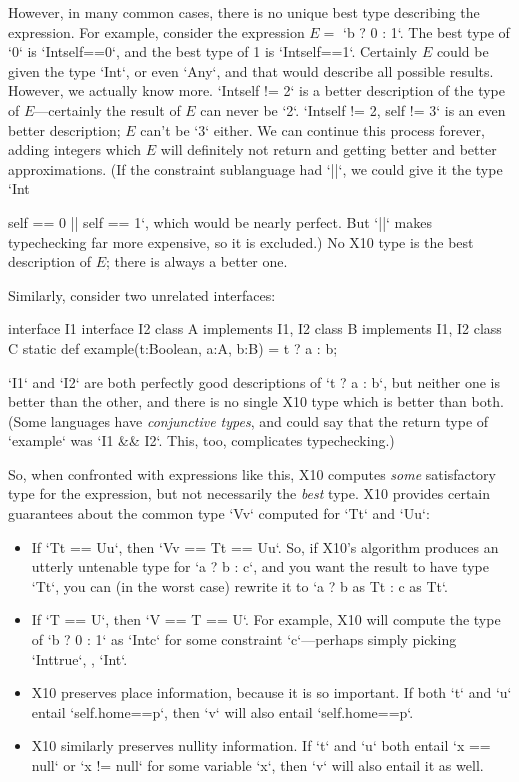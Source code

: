 However, in many common cases, there is no unique best type describing the
expression.  For example, consider the expression {$E=$} \xcd`b ? 0 : 1`.  The
best type of \xcd`0` 
is \xcd`Int{self==0}`, and the best type of 1 is \xcd`Int{self==1}`.
Certainly {$E$} could be given the type \xcd`Int`, or even \xcd`Any`, and that
would describe all possible results.  However, we actually know more.
\xcd`Int{self != 2}` is a better description of the type of {$E$}---certainly
the result of {$E$} can never be \xcd`2`.   \xcd`Int{self != 2, self != 3}` is
an even better description; {$E$} can't be \xcd`3` either.  We can continue
this process forever, adding integers which {$E$} will definitely not return
and getting better and better approximations. (If the constraint
sublanguage had \xcd`||`, we could give it the type 
\xcd`Int{self == 0 || self == 1`, which would be nearly perfect.  But 
\xcd`||` makes typechecking far more expensive, so it is excluded.)
No X10 type is the best description of {$E$}; there is always a better one.

Similarly, consider two unrelated interfaces: 
\begin{xten}
interface I1 {}
interface I2 {}
class A implements I1, I2 {}
class B implements I1, I2 {}
class C {
  static def example(t:Boolean, a:A, b:B) = t ? a : b;
}
\end{xten}
%
\xcd`I1` and \xcd`I2` are both perfectly good descriptions of \xcd`t ? a : b`, 
but neither one is better than the other, and there is no single X10 type
which is better than both. (Some languages have {\em conjunctive
    types}, and could say that the return type of \xcd`example` was 
\xcd`I1 && I2`.  This, too, complicates typechecking.)


So, when confronted with expressions like this, X10 computes {\em some}
satisfactory type for the expression, but not necessarily the {\em best} type.  
X10 provides certain guarantees about the common type \xcd`V{v}` computed for 
\xcd`T{t}` and \xcd`U{u}`: 
\begin{itemize}
\item If \xcd`T{t} == U{u}`, then \xcd`V{v} == T{t} == U{u}`.  So, if X10's
      algorithm produces an utterly untenable type for \xcd`a ? b : c`, and
      you want the result to have type \xcd`T{t}`, you can 
      (in the worst case) rewrite it to 
      \xcd`a ? b as T{t} : c as T{t}`.
\item If \xcd`T == U`, then \xcd`V == T == U`.  For example, 
      X10 will compute the type of \xcd`b ? 0 : 1` as 
      \xcd`Int{c}` for some constraint \xcd`c`---perhaps simply 
      picking \xcd`Int{true}`, \viz, \xcd`Int`. 
\item X10 preserves place information, because it is so important. If both
      \xcd`t` and \xcd`u` entail \xcd`self.home==p`, then  
      \xcd`v` will also entail \xcd`self.home==p`.  
\item X10 similarly preserves nullity information.  If \xcd`t` and \xcd`u`
      both entail \xcd`x == null` or \xcd`x != null` for some variable
      \xcd`x`, then \xcd`v` will also entail it as well.


\end{itemize}}
